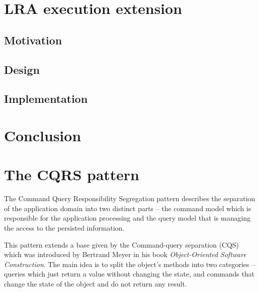 \documentclass[oneside,
  digital, %
  table,   %
  nolof,     %
  nolot,     %
]{fithesis3}
\begin{document}




\clearpage
\chapter{LRA execution extension}

\section{Motivation}

\section{Design}

\section{Implementation}

\clearpage
\chapter{Conclusion}



\makeatletter\thesis@blocks@clear\makeatother
{} %
\printindex




\appendix %

\chapter{The CQRS pattern}
\label{sec:appendix-cqrs}

The Command Query Responsibility Segregation pattern describes the separation of the application domain into two distinct parts -- the command model which is responsible for the application processing and the query model that is managing the access to the persisted information. 

This pattern extends a base given by the Command-query separation (CQS) which was introduced by Bertrand Meyer in his book \textit{Object-Oriented Software Construction}. The main idea is to split the object's methods into two categories -- queries which just return a value without changing the state, and commands that change the state of the object and do not return any result.
\end{document}
